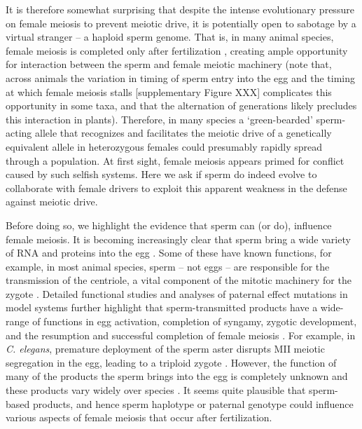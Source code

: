 \documentclass[12pt,letterpaper]{article}
\newcommand{\gc}[1]{{ \color{red} #1}}
\newcommand{\yb}[1]{{ \color{blue} #1}}
\begin{document}
It is therefore somewhat surprising that despite the intense evolutionary pressure on female meiosis to prevent meiotic drive, 
it is potentially open to sabotage by a virtual stranger -- a haploid sperm genome.
That is, in many animal species, female meiosis is completed only
after fertilization \citep{Masui_book}, creating ample opportunity for interaction between the sperm and
\yb{	female meiotic machinery (note that, across animals the variation in timing of sperm entry into the egg and the timing at which female meiosis stalls [supplementary Figure XXX] complicates this opportunity in some taxa, and that the alternation of generations likely precludes this interaction in plants).}
Therefore, in many species a `green-bearded' \citep{Gardner2010} sperm-acting allele that recognizes and facilitates the meiotic drive of a genetically equivalent allele in heterozygous females could presumably rapidly spread through a population. 
At first sight, female meiosis appears primed for conflict caused by such selfish systems. 
Here we ask if sperm do indeed evolve to collaborate with female drivers to exploit this 
	apparent weakness in the defense against meiotic drive. \newline 



Before doing so, we highlight the evidence that sperm can (or do), influence female meiosis. 
It is becoming increasingly clear that sperm bring a wide variety of RNA and proteins into the egg \citep{Miller:05}. 
 Some of these have known functions, for example, in most
        animal species, sperm -- not eggs -- are
        responsible for the transmission of the centriole, a vital
        component of the mitotic machinery for the zygote \citep{Schatten:94}. 
Detailed functional studies and analyses of paternal effect mutations in model
systems further highlight that sperm-transmitted products have a wide-range of functions in
 egg activation, completion of syngamy, zygotic development, and the resumption
 and successful completion of
 female meiosis \cite[e.g.][]{Yasuda:95,Loppin:05,Miller:01, McNally:05,Churchill:03}. 
 For example, in \emph{C. elegans}, premature deployment of the sperm aster 
	disrupts MII meiotic segregation in the egg, leading to a triploid zygote \citep{McNally2012}.
However, the function of many of the products the sperm brings into the
        egg is completely unknown and 
      these products vary widely over species \citep{Karrbook:09}. 
It seems quite plausible that sperm-based products, and
	hence sperm haplotype or paternal genotype could influence 
	various aspects of female meiosis that occur after fertilization. 
\newline
\end{document}
